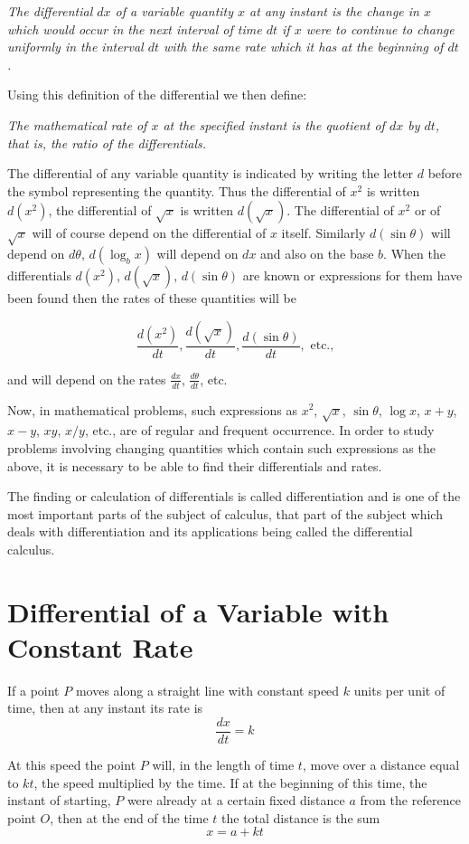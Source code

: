 \emph{The differential $dx$ of a variable quantity $x$ at any instant is the change in $x$ which would occur in the next interval of time $dt$ if $x$ were to continue to change uniformly in the interval $dt$ with the same rate which it has at the beginning of $dt$.}

Using this definition of the differential we then define:

\emph{The mathematical rate of $x$ at the specified instant is the quotient of $dx$ by $dt$, that is, the ratio of the differentials.}

The differential of any variable quantity is indicated by writing the letter $d$ before the symbol representing the quantity. Thus the differential of $x^2$ is written $d(x^2)$, the differential of $\sqrt{x}$ is written $d(\sqrt{x})$. The differential of $x^2$ or of $\sqrt{x}$ will of course depend on the differential of $x$ itself. Similarly $d(\sin \theta)$ will depend on $d\theta$, $d(\log_b x)$ will depend on $dx$ and also on the base $b$. When the differentials $d(x^2)$, $d(\sqrt{x})$, $d(\sin \theta)$ are known or expressions for them have been found then the rates of these quantities will be

\[\frac{d(x^2)}{dt}, \frac{d(\sqrt{x})}{dt}, \frac{d(\sin \theta)}{dt}, \text{ etc.,}\]

and will depend on the rates $\frac{dx}{dt}$, $\frac{d\theta}{dt}$, etc.

Now, in mathematical problems, such expressions as $x^2$, $\sqrt{x}$, $\sin \theta$, $\log x$, $x+y$, $x-y$, $xy$, $x/y$, etc., are of regular and frequent occurrence. In order to study problems involving changing quantities which contain such expressions as the above, it is necessary to be able to find their differentials and rates.

The finding or calculation of differentials is called differentiation and is one of the most important parts of the subject of calculus, that part of the subject which deals with differentiation and its applications being called the differential calculus.

\section{Differential of a Variable with Constant Rate}
If a point $P$ moves along a straight line with constant speed $k$ units per unit of time, then at any instant its rate is
\[\frac{dx}{dt} = k \tag{2} \label{2}\]

At this speed the point $P$ will, in the length of time $t$, move over a distance equal to $kt$, the speed multiplied by the time. If at the beginning of this time, the instant of starting, $P$ were already at a certain fixed distance $a$ from the reference point $O$, then at the end of the time $t$ the total distance is the sum
\[x = a + kt \tag{3} \label{3}\]

